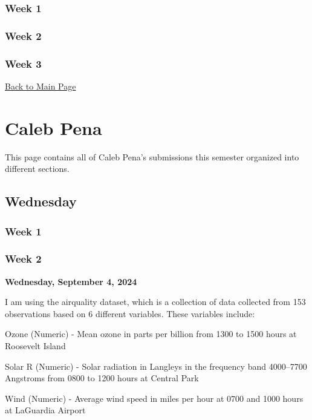 \documentclass[
  letterpaper,
  DIV=11,
  numbers=noendperiod]{scrreprt}
\begin{document}
\subsection{Week 1}\label{week-1-2}

\subsection{Week 2}\label{week-2-2}

\subsection{Week 3}\label{week-3-2}

\href{introduction.html}{Back to Main Page}


\chapter{Caleb Pena}\label{caleb-pena}

This page contains all of Caleb Pena's submissions this semester
organized into different sections.

\section{Wednesday}\label{wednesday-1}

\subsection{Week 1}\label{week-1-3}

\subsection{Week 2}\label{week-2-3}

\textbf{Wednesday, September 4, 2024}

I am using the airquality dataset, which is a collection of data
collected from 153 observations based on 6 different variables. These
variables include:

Ozone (Numeric) - Mean ozone in parts per billion from 1300 to 1500
hours at Roosevelt Island

Solar R (Numeric) - Solar radiation in Langleys in the frequency band
4000--7700 Angstroms from 0800 to 1200 hours at Central Park

Wind (Numeric) - Average wind speed in miles per hour at 0700 and 1000
hours at LaGuardia Airport
\end{document}
